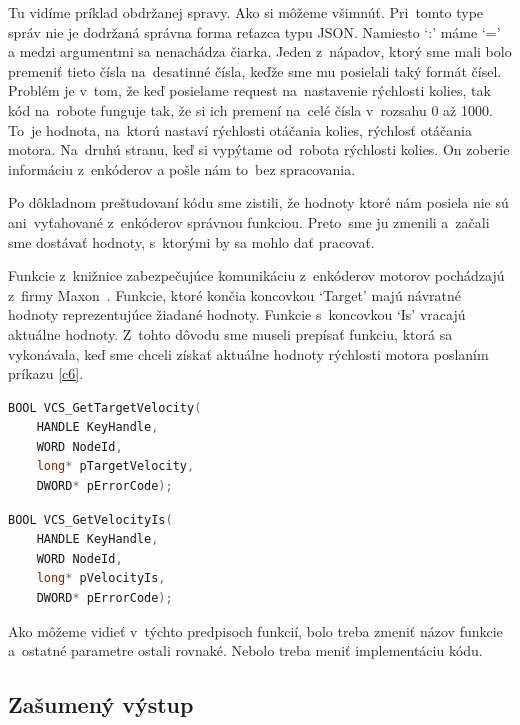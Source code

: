 Tu vidíme príklad obdržanej spravy. Ako si môžeme všimnúť. Pri~tomto type správ nie je dodržaná správna forma reťazca typu JSON. Namiesto `:' máme `='
a medzi argumentmi sa nenachádza čiarka. Jeden z~nápadov, ktorý sme mali bolo premeniť tieto čísla na~desatinné čísla, keďže sme mu posielali taký formát čísel.
Problém je v~tom, že keď posielame request na~nastavenie rýchlosti kolies, tak kód na~robote funguje tak, že si ich premení na~celé čísla v~rozsahu 0 až 1000.
To~je hodnota, na~ktorú nastaví rýchlosti otáčania kolies, rýchlosť otáčania motora. Na~druhú stranu, keď si vypýtame od~robota rýchlosti kolies. On zoberie
informáciu z~enkóderov a pošle nám to~bez spracovania.

Po dôkladnom preštudovaní kódu sme zistili, že hodnoty ktoré nám posiela nie sú ani~vyťahované z~enkóderov správnou funkciou. Preto~sme ju zmenili a~začali sme dostávať hodnoty,
s~ktorými by sa mohlo dať pracovať.

Funkcie z~knižnice zabezpečujúce komunikáciu z~enkóderov motorov pochádzajú z~firmy Maxon~\cite{EPOSdoc}. Funkcie, ktoré končia koncovkou `Target' majú
návratné hodnoty reprezentujúce žiadané hodnoty. Funkcie s~koncovkou `Is' vracajú aktuálne hodnoty. Z~tohto dôvodu sme museli prepísať funkciu, ktorá sa vykonávala,
keď sme chceli získať aktuálne hodnoty rýchlosti motora poslaním príkazu \ref{c6}.


\label{VelocityIs}
\begin{lstlisting}[language=C++]
BOOL VCS_GetTargetVelocity(
	HANDLE KeyHandle,
	WORD NodeId,
	long* pTargetVelocity,
	DWORD* pErrorCode);
\end{lstlisting}

\begin{lstlisting}[language=C++]
BOOL VCS_GetVelocityIs(
	HANDLE KeyHandle,
	WORD NodeId,
	long* pVelocityIs,
	DWORD* pErrorCode);
\end{lstlisting}

\noindent Ako môžeme vidieť v~týchto predpisoch funkcií, bolo treba zmeniť názov funkcie a~ostatné parametre ostali rovnaké.
Nebolo treba meniť implementáciu kódu.

\subsection{Zašumený výstup}

